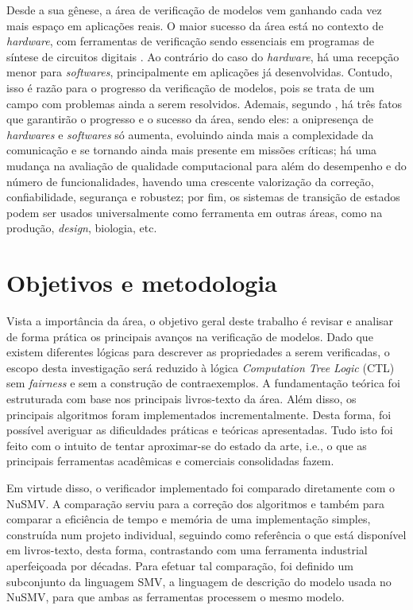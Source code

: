 \documentclass[cic,tc]{infufrgs}
\begin{document}
	Desde a sua gênese, a área de verificação de modelos vem ganhando cada vez mais espaço em aplicações reais. O maior sucesso da área está no contexto de \textit{hardware}, com ferramentas de verificação sendo essenciais em programas de síntese de circuitos digitais \cite{clarkeIntroductionModelChecking2018}. Ao contrário do caso do \textit{hardware}, há uma recepção menor para \textit{softwares}, principalmente em aplicações já desenvolvidas. 
	Contudo, isso é razão para o progresso da verificação de modelos, pois se trata de um campo com problemas ainda a serem resolvidos. 
	Ademais, segundo , há três fatos que garantirão o progresso e o sucesso da área, sendo eles: a onipresença de \textit{hardwares} e \textit{softwares} só aumenta, evoluindo ainda mais a complexidade da comunicação e se tornando ainda mais presente em missões críticas; há uma mudança na avaliação de qualidade computacional para além do desempenho e do número de funcionalidades, havendo uma crescente valorização da correção, confiabilidade, segurança e robustez; por fim, os sistemas de transição de estados podem ser usados universalmente como ferramenta em outras áreas, como na produção, \textit{design}, biologia, etc.
	
	\section{Objetivos e metodologia}
	Vista a importância da área, o objetivo geral deste trabalho é revisar e analisar de forma prática os principais avanços na verificação de modelos. 
	Dado que existem diferentes lógicas para descrever as propriedades a serem verificadas, o escopo desta investigação será reduzido à lógica \textit{Computation Tree Logic} (CTL) sem \textit{fairness} e sem a construção de contraexemplos. 
	A fundamentação teórica foi estruturada com base nos principais livros-texto da área.
	Além disso, os principais algoritmos foram implementados incrementalmente. Desta forma, foi possível averiguar as dificuldades práticas e teóricas apresentadas. 
	Tudo isto foi feito com o intuito de tentar aproximar-se do estado da arte, i.e., o que as principais ferramentas acadêmicas e comerciais consolidadas fazem. 
	
	Em virtude disso, o verificador implementado foi comparado diretamente com o NuSMV.
	A comparação serviu para a correção dos algoritmos e também para comparar a eficiência de tempo e memória de uma implementação simples, construída num projeto individual, seguindo como referência o que está disponível em livros-texto, desta forma, contrastando com uma ferramenta industrial aperfeiçoada por décadas.  
	Para efetuar tal comparação, foi definido um subconjunto da linguagem SMV, a linguagem de descrição do modelo usada no NuSMV, para que ambas as ferramentas processem o mesmo modelo.
	
\end{document}
